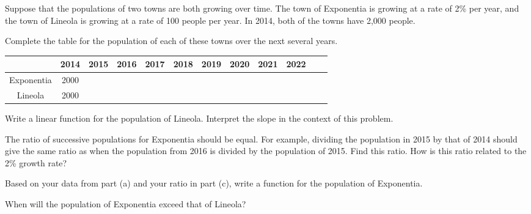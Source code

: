 \begin{pa} \label{PA:0.2}
Suppose that the populations of two towns are both growing over time.  The town of
Exponentia is growing at a rate of 2\% per year, and the town of Lineola is growing at a
rate of 100 people per year.  In 2014, both of the towns have 2,000 people.
\ba
    \item Complete the table for the population of each of these towns over the next
        several years.
        \begin{center}
            \begin{tabular}[h!]{|c|c|c|c|c|c|c|c|c|c|c|c|}
                \hline
                & 2014 & 2015 & 2016 & 2017 & 2018 & 2019 & 2020 & 2021 & 2022 \\ \hline
                Exponentia & 2000 & & & & & & & & \\ \hline
                Lineola &  2000 & & & & & & & & \\ \hline
            \end{tabular}
        \end{center}
    \item Write a linear function for the population of Lineola. Interpret the slope in
        the context of this problem.
    \item The ratio of successive populations for Exponentia should be equal.  For
        example, dividing the population in 2015 by that of 2014 should give the same
        ratio as when the population from 2016 is divided by the population of 2015.  Find
        this ratio.  How is this ratio related to the 2\% growth rate?
    \item Based on your data from part (a) and your ratio in part (c), write a function
        for the population of Exponentia.
    \item When will the population of Exponentia exceed that of Lineola?
\ea
\end{pa} \afterpa
